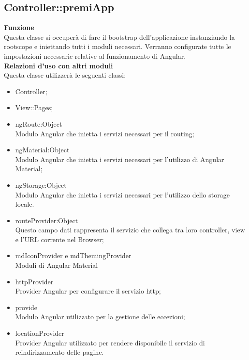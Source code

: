 {	\subsection{Controller::\-premiApp}{
		\label{sec:premiapp}
		\textbf{Funzione}\\
		\indent Questa classe si occuperà di fare il bootstrap dell'applicazione instanziando la rootscope  e iniettando tutti i moduli necessari. Verranno configurate tutte le impostazioni necessarie relative al funzionamento di Angular.\\
		\textbf{Relazioni d'uso con altri moduli}\\
		\indent Questa classe utilizzerà le seguenti classi:
		\begin{itemize}
			\item Controller;
			\item View::Pages;
			\item ngRoute:Object\\
				\indent Modulo Angular che inietta i servizi necessari per il routing;
			\item ngMaterial:Object\\
				\indent Modulo Angular che inietta i servizi necessari per l'utilizzo di Angular Material;
			\item ngStorage:Object\\
				\indent Modulo Angular che inietta i servizi necessari per l'utilizzo dello storage locale.
			\item \textdollar routeProvider:Object\\
				\indent Questo campo dati rappresenta il servizio che collega tra loro controller, view e l'URL corrente nel Browser;
			\item \textdollar mdIconProvider e \textdollar mdThemingProvider\\
				\indent Moduli di Angular Material
			\item \textdollar httpProvider\\
				\indent Provider Angular per configurare il servizio http;
			\item \textdollar provide\\
				\indent Modulo Angular utilizzato per la gestione delle eccezioni;
			\item \textdollar locationProvider\\
				\indent Provider Angular utilizzato per rendere disponibile il servizio di reindirizzamento delle pagine.
		\end{itemize}
	}

}
